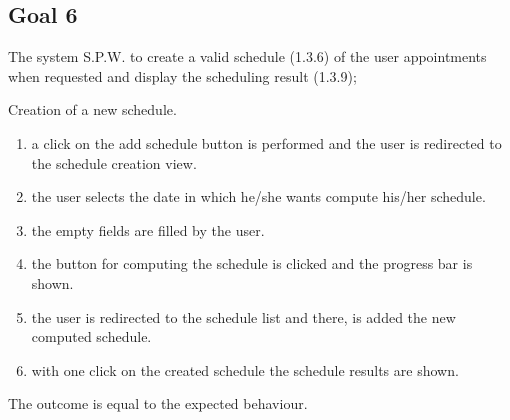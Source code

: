 \subsection{Goal 6}

The system S.P.W. to create a valid schedule (1.3.6) of the user appointments when
requested and display the scheduling result (1.3.9);

{Creation of a new schedule.}
{{\begin{enumerate}
\item a click on the add schedule button is performed and the user is redirected to the schedule creation view.
\item the user selects the date in which he/she wants compute his/her schedule.
\item the empty fields are filled by the user.
\item the button for computing the schedule is clicked and the progress bar is shown.
\item the user is redirected to the schedule list and there, is added the new computed schedule.
\item with one click on the created schedule the schedule results are shown.
\end{enumerate}}}
{The outcome is equal to the expected behaviour.}
